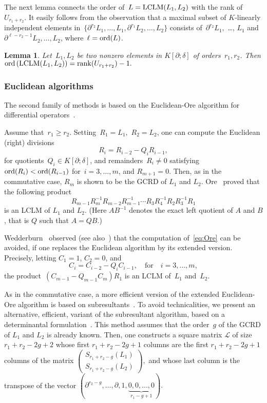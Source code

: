 \documentclass{sig-alt-full}
\newcommand{\pa} { \partial}
\newcommand{\rank}   { {\rm rank} }
\newcommand{\ord} { {\rm ord}}
\newcommand{\lclm} { {\rm LCLM}}
\newtheorem{lemma}[theorem]{Lemma}
\begin{document}
The next lemma connects the order of~$L=\lclm(L_1, L_2)$ with the rank of~$U_{r_1+r_2}$. 
It easily follows from the observation that a maximal subset of
$K$-linearly independent elements in~$\{ \partial^{r_2} L_1, \ldots, L_1, \partial^{r_1} L_2, \ldots, L_2\}$
consists of~$\partial^{r_2}L_1,$ \ldots, $L_1$ and~$\partial^{\ell - r_2-1} L_2, \ldots, L_2$, where~$\ell = \ord(L)$.
\begin{lemma} \label{LM:prank}
Let~$L_1, L_2$ be two nonzero elements in $K[\pa; \delta]$ of orders~$r_1,r_2$.
Then $\ord \left( \lclm(L_1, L_2) \right) = \rank(U_{r_1+r_2}) - 1.$
\end{lemma}

\subsubsection{Euclidean algorithms}
The second family of methods is based on the Euclidean-Ore algorithm for differential operators~\cite{Ore33}. 

\medskip {} Assume that~$r_1 \ge r_2$. Setting~$R_1=L_1,$ $R_2=L_2$, one can compute the Euclidean (right) divisions 
\[   R_i = R_{i-2} - Q_i R_{i-1}, \]
for quotients~$Q_i \in K[\pa; \delta]$, and remainders~$R_i \neq 0$ satisfying $\ord(R_i) < \ord(R_{i-1})$ for~$i=3, \ldots, m$, and $R_{m+1}=0$. Then, as in the commutative case, $R_m$ is shown to be the GCRD of $L_1$ and $L_2$. 
Ore~\cite[\S2]{Ore33} proved that the following product 
\begin{equation} \label{eq:Ore} R_{m-1} R_m^{-1}
R_{m-2} R_{m-1}^{-1} \cdots R_3 R_4^{-1} R_2 R_3^{-1} R_1 
\end{equation} is an LCLM of $L_1$ and $L_2$. (Here $AB^{-1}$ denotes the exact left quotient of $A$ and $B$, that is $Q$ such that $A=QB$.)

\medskip {} Wedderburn~\cite[\S7-8]{Wedderburn1932} observed (see also~\cite{BrPe94})
that the
computation of~\eqref{eq:Ore} can be avoided, if one replaces the Euclidean
algorithm by its extended version. Precisely, letting $C_1=1$, $C_2=0$, and
 \[C_i=C_{i-2} - Q_i C_{i-1}, \quad \textrm{for} \quad i=3, \ldots,
m,\]  the product~$(C_{m-1} - Q_{m-1} C_m)R_1$ is an LCLM of~$L_1$ and~$L_2$.

\medskip {}
As in the commutative case, a more efficient version of the extended Euclidean-Ore algorithm is based on subresultants~\cite[\S5]{Li98}.
To avoid technicalities, we present an alternative, efficient, variant of the subresultant algorithm, 
based on a determinantal formulation~\cite[Proposition~6.1]{Li98}. This method assumes that the order~$g$ of the GCRD of $L_1$ and $L_2$ is already known. Then, one constructs a square matrix $\mathcal{L}$ of size $r_1+r_2-2g+2$ whose first $r_1+r_2-2g+1$ columns are the first $r_1+r_2-2g+1$ columns of the matrix 
$ \left( \begin{array}{c}
           S_{r_1+r_2-g}(L_1) \\
           S_{r_1+r_2-g}(L_2)
           \end{array} \right),
$
and whose last column is the transpose of the vector
$ (\pa^{r_2-g}, \ldots, \pa, 1, \underbrace{0, 0, \ldots, 0}_{r_1-g+1}).$
\end{document}

